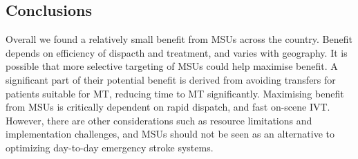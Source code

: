 \subsection{Conclusions}

Overall we found a relatively small benefit from MSUs across the country. Benefit depends on efficiency of dispacth and treatment, and varies with geography. It is possible that more selective targeting of MSUs could help maximise benefit. A significant part of their potential benefit is derived from avoiding transfers for patients suitable for MT, reducing time to MT significantly. Maximising benefit from MSUs is critically dependent on rapid dispatch, and fast on-scene IVT. However, there are other considerations such as resource limitations and implementation challenges, and MSUs should not be seen as an alternative to optimizing day-to-day emergency stroke systems.